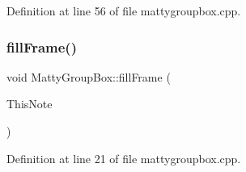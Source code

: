 Definition at line 56 of file mattygroupbox.\+cpp.

\hypertarget{classMattyGroupBox_a982e84ed3ae5f61b542269e9b5e8ebba}{}\label{classMattyGroupBox_a982e84ed3ae5f61b542269e9b5e8ebba} 
\subsubsection{\texorpdfstring{fill\+Frame()}{fillFrame()}}
{\footnotesize\ttfamily void Matty\+Group\+Box\+::fill\+Frame (\begin{DoxyParamCaption}\item[{const class \hyperlink{classMattyNote}{Matty\+Note} \&}]{This\+Note }\end{DoxyParamCaption})\hspace{0.3cm}{\ttfamily [private]}}



Definition at line 21 of file mattygroupbox.\+cpp.

